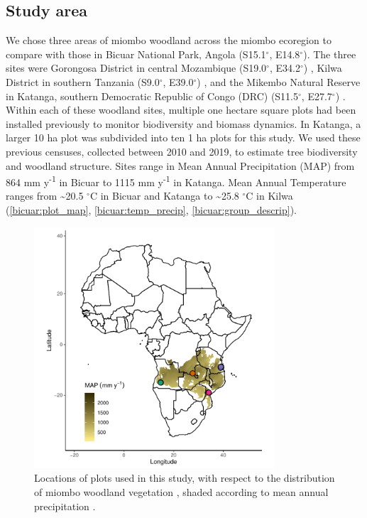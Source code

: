 \begin{refsection}
\subsection{Study area}
\label{bicuar:ssec:plot_loc}

We chose three areas of miombo woodland across the miombo ecoregion to compare with those in Bicuar National Park, Angola (S15.1$^\circ$, E14.8$^\circ$). The three sites were Gorongosa District in central Mozambique (S19.0$^\circ$, E34.2$^\circ$) \citep{Ryan2011}, Kilwa District in southern Tanzania (S9.0$^\circ$, E39.0$^\circ$) \citep{McNicol2018a}, and the Mikembo Natural Reserve in Katanga, southern Democratic Republic of Congo (DRC) (S11.5$^\circ$, E27.7$^\circ$) \citep{Muledi2017}. Within each of these woodland sites, multiple one hectare square plots had been installed previously to monitor biodiversity and biomass dynamics. In Katanga, a larger 10 ha plot was subdivided into ten 1 ha plots for this study. We used these previous censuses, collected between 2010 and 2019, to estimate tree biodiversity and woodland structure. Sites range in Mean Annual Precipitation (MAP) from 864 mm y\textsuperscript{-1} in Bicuar to 1115 mm y\textsuperscript{-1} in Katanga. Mean Annual Temperature ranges from \textasciitilde{}20.5 $^\circ$C in Bicuar and Katanga to \textasciitilde{}25.8 $^\circ$C in Kilwa (\autoref{bicuar:plot_map}, \autoref{bicuar:temp_precip}, \autoref{bicuar:group_descrip}).

\begin{figure}
	\includegraphics[width=0.8\textwidth]{img/plot_map}
	\caption[Plot locations within miombo ecoregion]{Locations of plots used in this study, with respect to the distribution of miombo woodland vegetation \citep{White1983}, shaded according to mean annual precipitation \citep{Fick2017}.}
	\label{bicuar:plot_map}
\end{figure}


\end{refsection}
